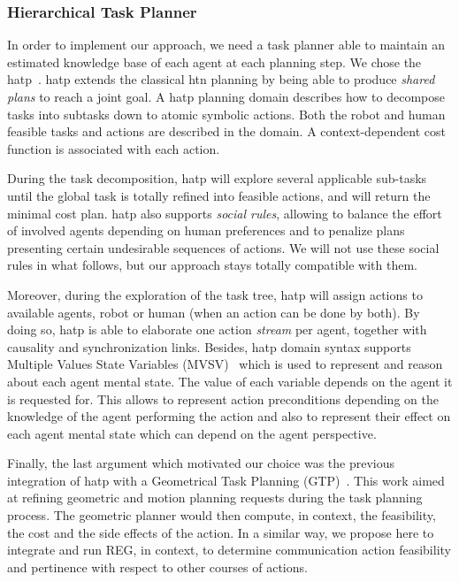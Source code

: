 \documentclass[a4paper,11pt,twoside]{StyleThese}
\begin{document}
\subsubsection{Hierarchical Task Planner}

In order to implement our approach, we need a task planner able to maintain an estimated knowledge base of each agent at each planning step. We chose the \acrfull{hatp}~\cite{lallement2014hatp}. \acrshort{hatp} extends the classical \acrfull{htn} planning by being able to produce \textit{shared plans} to reach a joint goal. A \acrshort{hatp} planning domain describes how to decompose tasks into subtasks down to atomic symbolic actions. Both the robot and human feasible tasks and actions are described in the domain. A context-dependent cost function is associated with each action. 

During the task decomposition, \acrshort{hatp} will explore several applicable sub-tasks until the global task is totally refined into feasible actions, and will return the minimal cost plan. \acrshort{hatp} also supports \textit{social rules}, allowing to balance the effort of involved agents depending on human preferences and to penalize plans presenting certain undesirable sequences of actions. We will not use these social rules in what follows, but our approach stays totally compatible with them.

Moreover, during the exploration of the task tree, \acrshort{hatp} will assign actions to available agents, robot or human (when an action can be done by both). By doing so, \acrshort{hatp} is able to elaborate one action \textit{stream} per agent, together with causality and synchronization links. 
Besides, \acrshort{hatp} domain syntax supports Multiple Values State Variables (MVSV)~\cite{guitton2012belief} which is used to represent and reason about each agent mental state. The value of each variable depends on the agent it is requested for. This allows to represent action preconditions depending on the knowledge of the agent performing the action and also to represent their effect on each agent mental state which can depend on the agent perspective.

Finally, the last argument which motivated our choice was the previous integration of \acrshort{hatp}  with a  Geometrical Task Planning (GTP)~\cite{gharbi2015combining}. This work aimed at refining geometric and motion planning requests during the task planning process. The geometric planner would then compute, in context, the feasibility, the cost and the side effects of the action. In a similar way, we propose here to integrate and run REG, in context, to determine communication action feasibility and pertinence with respect to other courses of actions.
\end{document}
